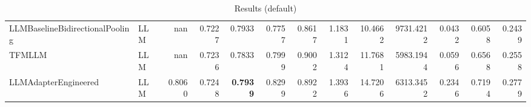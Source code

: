 \begin{table}[htbp]
{\begin{tabular}{ll|rrrrrrrrrrr}
LLMBaselineBidirectionalPooling & LLM & nan & 0.7227 & 0.7933 & 0.7757 & 0.8617 & 1.1831 & 10.4662 & 9731.4212 & 0.0432 & 0.6058 & 0.2439 \\
TFMLLM & LLM & nan & 0.7236 & 0.7833 & 0.7999 & 0.9002 & 1.3124 & 11.7681 & 5983.1944 & 0.0596 & 0.6568 & 0.2558 \\
LLMAdapterEngineered & LLM & 0.8060 & 0.7248 & \textbf{0.7939} & 0.8299 & 0.8922 & 1.3936 & 14.7206 & 6313.3452 & 0.2346 & 0.7194 & 0.2779 \\
\bottomrule
\end{tabular}
}
\caption{Results (default)}
\label{tab:results_default}
\end{table}